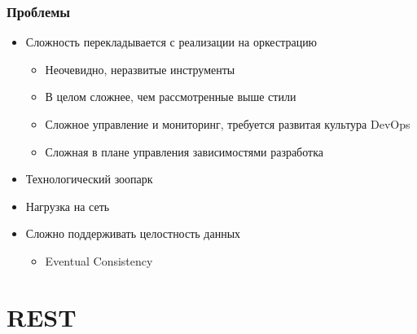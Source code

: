 \documentclass{../../slides-style}
\begin{document}
    \begin{frame}
        \frametitle{Проблемы}
        \begin{itemize}
            \item Сложность перекладывается с реализации на оркестрацию
            \begin{itemize}
                \item Неочевидно, неразвитые инструменты
                \item В целом сложнее, чем рассмотренные выше стили
                \item Сложное управление и мониторинг, требуется развитая культура DevOps
                \item Сложная в плане управления зависимостями разработка
            \end{itemize}
            \item Технологический зоопарк
            \item Нагрузка на сеть
            \item Сложно поддерживать целостность данных
            \begin{itemize}
                \item Eventual Consistency
            \end{itemize}
        \end{itemize}
    \end{frame}

    \section{REST}
    
\end{document}
